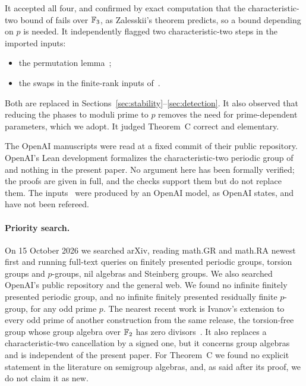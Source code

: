 \begin{itemize}[leftmargin=*]
  It accepted all four, and confirmed by exact computation that the characteristic-two bound of
  \cite[Lemma~3.2]{OAI247periodic} fails over $\mathbb F_3$, as Zalesskii's theorem predicts, so a bound depending on $p$ is needed. It
  independently flagged two characteristic-two steps in the imported inputs:
  \begin{itemize}
  \item the permutation lemma~\cite[Lemma~3.3]{OAI247rf};
  \item the swaps in the finite-rank inputs of~\cite[Section~5]{OAI247periodic}.
  \end{itemize}
  Both are replaced in Sections~\ref{sec:stability}--\ref{sec:detection}. It also observed that reducing the phases to
  moduli prime to $p$ removes the need for prime-dependent parameters, which we adopt. It judged Theorem~C correct and
  elementary.
\end{itemize}
The OpenAI manuscripts were read at a fixed commit of their public repository. OpenAI's Lean development formalizes the
characteristic-two periodic group of~\cite{OAI247periodic} and nothing in the present paper. No argument here has been
formally verified; the proofs are given in full, and the checks support them but do not replace them. The
inputs~\cite{OAI247periodic,OAI247rf} were produced by an OpenAI model, as OpenAI states, and have not been refereed.

\paragraph{Priority search.} On 15 October 2026 we searched arXiv, reading math.GR and math.RA newest first and running
full-text queries on finitely presented periodic groups, torsion groups and $p$-groups, nil algebras and Steinberg groups.
We also searched OpenAI's public repository and the general web. We found no infinite finitely presented periodic group,
and no infinite finitely presented residually finite $p$-group, for any odd prime $p$. The nearest recent work is
Ivanov's extension to every odd prime of another construction from the same release, the torsion-free group whose
group algebra over $\mathbb F_2$ has zero divisors~\cite{Ivanov2026}. It also replaces a characteristic-two cancellation by a
signed one, but it concerns group algebras and is independent of the present paper. For Theorem~C we found no explicit
statement in the literature on semigroup algebras, and, as said after its proof, we do not claim it as new.
